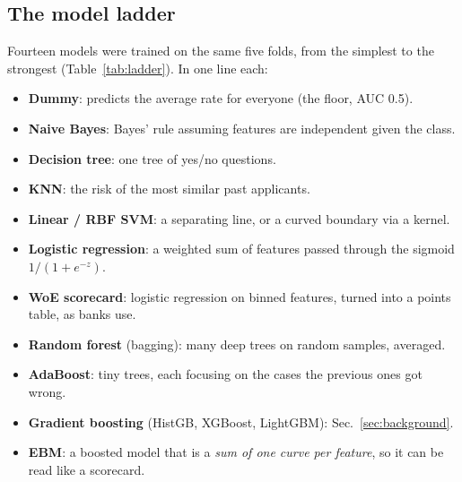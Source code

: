 \documentclass[conference,10pt]{IEEEtran}
\begin{document}
\subsection{The model ladder}
Fourteen models were trained on the same five folds, from the simplest to the strongest
(Table~\ref{tab:ladder}). In one line each:
\begin{itemize}
\item \textbf{Dummy}: predicts the average rate for everyone (the floor, AUC 0.5).
\item \textbf{Naive Bayes}: Bayes' rule assuming features are independent given the class.
\item \textbf{Decision tree}: one tree of yes/no questions.
\item \textbf{KNN}: the risk of the most similar past applicants.
\item \textbf{Linear / RBF SVM}: a separating line, or a curved boundary via a kernel.
\item \textbf{Logistic regression}: a weighted sum of features passed through the sigmoid
$1/(1+e^{-z})$.
\item \textbf{WoE scorecard}: logistic regression on binned features, turned into a points
table, as banks use.
\item \textbf{Random forest} (bagging): many deep trees on random samples, averaged.
\item \textbf{AdaBoost}: tiny trees, each focusing on the cases the previous ones got wrong.
\item \textbf{Gradient boosting} (HistGB, XGBoost, LightGBM): Sec.~\ref{sec:background}.
\item \textbf{EBM}: a boosted model that is a \emph{sum of one curve per feature}, so it can be
read like a scorecard.
\end{itemize}
\end{document}

